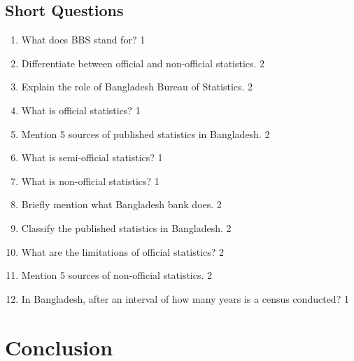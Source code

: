 \documentclass[a4paper,oneside]{book}
\begin{document}
 
 \section{Short Questions}
 \begin{enumerate}

    \item What does BBS stand for?  \hfill 1
    \item Differentiate between official and non-official statistics. \hfill 2
    \item Explain the role of Bangladesh Bureau of Statistics. \hfill 2
    \item What is official statistics?  \hfill 1
    \item Mention 5 sources of published statistics in Bangladesh. \hfill 2
    \item What is semi-official statistics?  \hfill 1
    \item What is non-official statistics?  \hfill 1
    \item Briefly mention what Bangladesh bank does.  \hfill 2
    \item Classify the published statistics in Bangladesh. \hfill 2
    \item What are the limitations of official statistics? \hfill 2
    \item Mention 5 sources of non-official statistics. \hfill 2
    \item In Bangladesh, after an interval of how many years is a census 
    conducted?  \hfill 1
    
    \end{enumerate}

\backmatter
\chapter{Conclusion}
\lipsum[8]



\tableofcontents
\end{document}
